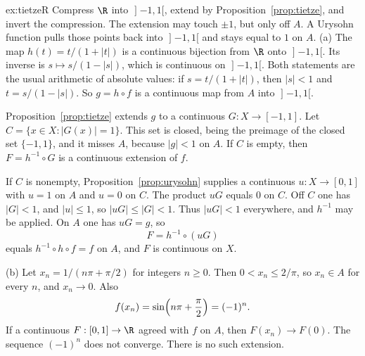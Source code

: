 \begin{solution}{ex:tietzeR}
\idea Compress $\R$ into $\mathopen]-1,1[$, extend by Proposition~\ref{prop:tietze}, and invert the compression. The extension may touch $\pm1$, but only off $A$. A Urysohn function pulls those points back into $\mathopen]-1,1[$ and stays equal to $1$ on $A$.
\writeup (a) The map $h(t)=t/(1+|t|)$ is a continuous bijection from $\R$ onto $\mathopen]-1,1[$. Its inverse is $s\mapsto s/(1-|s|)$, which is continuous on $\mathopen]-1,1[$. Both statements are the usual arithmetic of absolute values: if $s=t/(1+|t|)$, then $|s|<1$ and $t=s/(1-|s|)$. So $g=h\circ f$ is a continuous map from $A$ into $\mathopen]-1,1[$.

Proposition~\ref{prop:tietze} extends $g$ to a continuous $G:X\to[-1,1]$. Let $C=\{x\in X:|G(x)|=1\}$. This set is closed, being the preimage of the closed set $\{-1,1\}$, and it misses $A$, because $|g|<1$ on $A$. If $C$ is empty, then $F=h^{-1}\circ G$ is a continuous extension of $f$.

If $C$ is nonempty, Proposition~\ref{prop:urysohn} supplies a continuous $u:X\to[0,1]$ with $u=1$ on $A$ and $u=0$ on $C$. The product $uG$ equals $0$ on $C$. Off $C$ one has $|G|<1$, and $|u|\le1$, so $|uG|\le|G|<1$. Thus $|uG|<1$ everywhere, and $h^{-1}$ may be applied. On $A$ one has $uG=g$, so
\[
F=h^{-1}\circ(uG)
\]
equals $h^{-1}\circ h\circ f=f$ on $A$, and $F$ is continuous on $X$.

(b) Let $x_n=1/(n\pi+\pi/2)$ for integers $n\ge0$. Then $0<x_n\le 2/\pi$, so $x_n\in A$ for every $n$, and $x_n\to0$. Also
\[
f(x_n)=\sin\Bigl(n\pi+\frac\pi2\Bigr)=(-1)^n.
\]
If a continuous $F:[0,1]\to\R$ agreed with $f$ on $A$, then $F(x_n)\to F(0)$. The sequence $(-1)^n$ does not converge. There is no such extension.
\end{solution}

